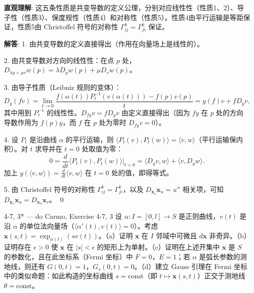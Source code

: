 \begin{solution}
\textbf{直观理解}: 这五条性质是共变导数的定义公理，分别对应线性性（性质1、2）、导子性（性质3）、保度规性（性质4）和对称性（性质5）。性质4由平行运输是等距保证，性质5由 Christoffel 符号的对称性 $\Gamma_{ij}^k = \Gamma_{ji}^k$ 保证。

\textbf{解答}: 1. 由共变导数的定义直接得出（作用在向量场上是线性的）。

2. 由共变导数对方向的线性性：在点 $p$ 处，$D_{\lambda y+\mu v}w(p) = \lambda D_y w(p) + \mu D_v w(p)$。

3. 由导子性质（Leibniz 规则的变体）：
\[
D_y(fv) = \lim_{t\to 0}\frac{f(\alpha(t))P_t^{-1}(v(\alpha(t))) - f(p)v(p)}{t} = y(f)v + f D_yv,
\]
其中用到 $P_t^{-1}$ 的线性性。$D_{fy}v = f D_yv$ 由定义直接得出（因为 $fy$ 在 $p$ 处的方向导数作用为 $f(p)y$，而 $f$ 在 $p$ 处为零时 $D_{fy}v=0$）。

4. 设 $P_t$ 是沿曲线 $\alpha$ 的平行运输，则 $\langle P_t(v), P_t(w)\rangle = \langle v,w\rangle$（平行运输保内积）。对 $t$ 求导并在 $t=0$ 处取值为零：
\[
0 = \frac{d}{dt}\langle P_t(v), P_t(w)\rangle\Big|_{t=0} = \langle D_yv, w\rangle + \langle v, D_yw\rangle.
\]
加上 $y(\langle v,w\rangle) = \frac{d}{dt}\langle v,w\rangle$ 在 $t=0$ 处的值，即得等式。

5. 由 Christoffel 符号的对称性 $\Gamma_{ij}^k = \Gamma_{ji}^k$，以及 $D_{\mathbf{x}_v}\mathbf{x}_u = u''$ 相关项，可知 $D_{\mathbf{x}_v}\mathbf{x}_u = D_{\mathbf{x}_u}\mathbf{x}_v$。
\qed
\end{solution}

\begin{exercise}{4-7, 3* — do Carmo, Exercise 4-7, 3}
设 $\alpha: I = [0,l] \to S$ 是正则曲线，$v(t)$ 是沿 $\alpha$ 的单位法向量场（$\langle \alpha'(t), v(t) \rangle = 0$）。考虑 $\mathbf{x}(s,t) = \exp_{\alpha(t)}(s v(t))$。（a）证明 $\mathbf{x}$ 在 $I$ 邻域中可微且 $d\mathbf{x}$ 非奇异。（b）证明存在 $\epsilon > 0$ 使 $\mathbf{x}$ 在 $|s| < \epsilon$ 的矩形上为单射。（c）证明在上述开集中 $\mathbf{x}$ 是 $S$ 的参数化，且在此坐标系（Fermi 坐标）中 $F=0$，$E=1$；若 $\alpha$ 是弧长参数的测地线，则还有 $G(0,t)=1$，$G_s(0,t)=0$。（d）建立 Gauss 引理在 Fermi 坐标中的类似命题：如此构造的坐标曲线 $s=\mathrm{const}$（即 $t \mapsto \mathbf{x}(s,t)$）正交于测地线 $\theta=\mathrm{const}$。
\end{exercise}

